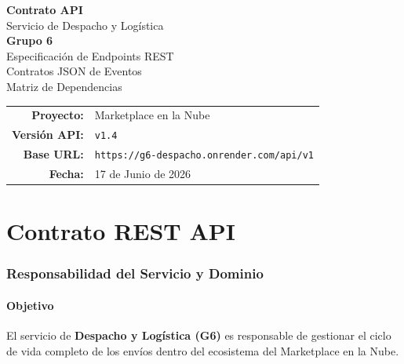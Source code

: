 \documentclass[11pt, a4paper]{article}
\begin{document}
\begin{titlepage}
\centering
\vspace*{2.5cm}

{\Huge\bfseries\textcolor{primary}{Contrato API}}\\[0.3cm]
{\LARGE\textcolor{primary!70}{Servicio de Despacho y Logística}}\\[0.5cm]
{\Large\textcolor{accent}{\textbf{Grupo 6}}}\\[2cm]

{\large Especificación de Endpoints REST}\\[0.2cm]
{\large Contratos JSON de Eventos}\\[0.2cm]
{\large Matriz de Dependencias}\\[3cm]

\begin{tabular}{rl}
  \textbf{Proyecto:}     & Marketplace en la Nube \\
  \textbf{Versión API:}  & \texttt{v1.4} \\
  \textbf{Base URL:}     & \texttt{https://g6-despacho.onrender.com/api/v1} \\
  \textbf{Fecha:}        & 17 de Junio de 2026 \\
\end{tabular}

\vfill



\end{titlepage}

\tableofcontents
\newpage


\part{Contrato REST API}

\section{Responsabilidad del Servicio y Dominio}

\subsection{Objetivo}

El servicio de \textbf{Despacho y Logística (G6)} es responsable de gestionar el ciclo de vida completo de los envíos dentro del ecosistema del Marketplace en la Nube.
\end{document}
